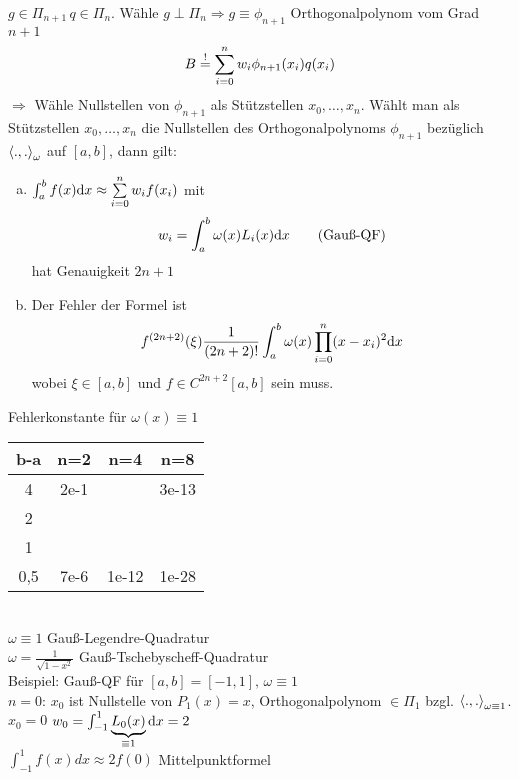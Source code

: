$g \in \Pi_{n+1}\, q \in \Pi_n$. Wähle $g \perp \Pi_n \Rightarrow g \equiv \phi_{n+1}$ Orthogonalpolynom vom Grad $n+1$
\begin{align*}
  B \overset{!}{=} \sum\limits_{i=0}^{n}{w_i \phi_{n+1}(x_i) q(x_i)}
\end{align*}
$\Rightarrow$ Wähle Nullstellen von $\phi_{n+1}$ als Stützstellen $x_0, \ldots,x_n$.
 Wählt man als Stützstellen $x_0,\ldots,x_n$ die Nullstellen
des Orthogonalpolynoms $\phi_{n+1}$ bezüglich $\left\langle ., . \right\rangle_\omega$ auf $[a,b]$, dann gilt:
\begin{enumerate}[a)]
  \item $\int_a^b f(x) \mathrm{d}x \approx \sum\limits_{i=0}^{n}{w_i f(x_i)}$ mit
    \begin{align*} w_i = \int_a^b \omega(x) L_i(x) \mathrm{d}x \tag{Gauß-QF}\end{align*}
    hat Genauigkeit $2n + 1$
  \item Der Fehler der Formel ist \begin{align*}
      f^{(2n+2)}(\xi) \frac{1}{(2n+2)!} \int_a^b \omega(x) \prod_{i=0}^{n} (x-x_i)^2 \mathrm{d}x
    \end{align*} wobei $\xi \in [a,b]$ und $f \in C^{2n+2}[a,b]$ sein muss.
\end{enumerate}
Fehlerkonstante für $\omega(x) \equiv 1$\\
\begin{tabular}{ c | c | c | c}
  b-a & n=2 & n=4 & n=8 \\
  \hline
  4   &  2e-1 & & 3e-13\\
  2   &       & &      \\
  1   &       & &      \\
  0,5 & 7e-6  & 1e-12 & 1e-28\\
\end{tabular}\\
$\omega \equiv 1$ Gauß-Legendre-Quadratur\\
$\omega = \frac{1}{\sqrt{1-x^2}}$  Gauß-Tschebyscheff-Quadratur\\

Beispiel: Gauß-QF für $[a,b] = [-1,1],\, \omega \equiv 1$\\
$n=0$: $x_0$ ist Nullstelle von $P_1(x)=x$, Orthogonalpolynom $\in \Pi_1$ bzgl. $\left\langle ., . \right\rangle_{\omega \equiv 1}$.\\
$x_0 = 0$ $w_0 = \int_{-1}^1 \underbrace{L_0(x)}_{\equiv 1} \mathrm{d}x = 2$\\
$\int_{-1}^1 f(x) dx \approx 2 f(0)$ Mittelpunktformel\\

